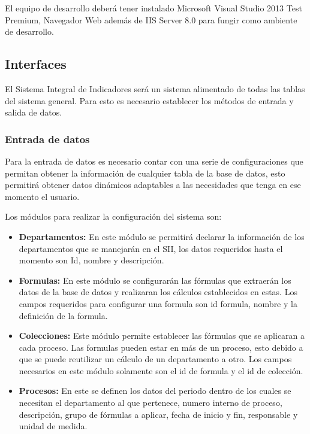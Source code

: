 		El equipo de desarrollo deber\'a tener instalado Microsoft Visual Studio 2013 Test Premium, Navegador Web adem\'as de IIS Server 8.0 para fungir como ambiente de desarrollo.\\

		\subsection{Interfaces}
		
			El Sistema Integral de Indicadores ser\'a un sistema alimentado de todas las tablas del sistema general. Para esto es necesario establecer los m\'etodos de entrada y salida de datos.\\

			\subsubsection{Entrada de datos}

				Para la entrada de datos es necesario contar con una serie de configuraciones que permitan obtener la informaci\'on de cualquier tabla de la base de datos, esto permitir\'a obtener datos din\'amicos adaptables a las necesidades que tenga en ese momento el usuario.

				Los m\'odulos para realizar la configuraci\'on del sistema son:
				\begin{itemize}
					\item \textbf{Departamentos:} En este m\'odulo se permitir\'a declarar la informaci\'on de los departamentos que se manejar\'an en el SII, los datos requeridos hasta el momento son Id, nombre y descripci\'on.
					\item \textbf{Formulas:} En este m\'odulo se configurar\'an las f\'ormulas que extraer\'an los datos de la base de datos y realizaran los c\'alculos establecidos en estas. Los campos requeridos para configurar una formula son id formula, nombre y la definici\'on de la formula.
					\item \textbf{Colecciones:} Este m\'odulo permite establecer las f\'ormulas que se aplicaran a cada proceso. Las formulas pueden estar en m\'as de un proceso, esto debido a que se puede reutilizar un cálculo de un departamento a otro. Los campos necesarios en este m\'odulo solamente son el id de formula y el id de colecci\'on.
					\item \textbf{Procesos:} En este se definen los datos del periodo dentro de los cuales se necesitan el departamento al que pertenece, numero interno de proceso, descripci\'on, grupo de f\'ormulas a aplicar, fecha de inicio y fin, responsable y unidad de medida.
				\end{itemize}

